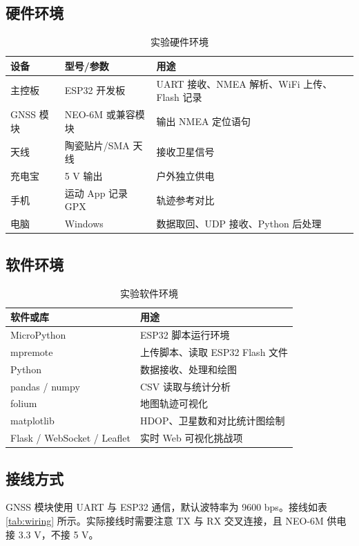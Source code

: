\documentclass[UTF8,a4paper,12pt]{ctexart}
\begin{document}
\subsection{硬件环境}
\begin{table}[H]
\centering
\caption{实验硬件环境}
\begin{tabular}{lll}
\toprule
设备 & 型号/参数 & 用途 \\
\midrule
主控板 & ESP32 开发板 & UART 接收、NMEA 解析、WiFi 上传、Flash 记录 \\
GNSS 模块 & NEO-6M 或兼容模块 & 输出 NMEA 定位语句 \\
天线 & 陶瓷贴片/SMA 天线 & 接收卫星信号 \\
充电宝 & 5 V 输出 & 户外独立供电 \\
手机 & 运动 App 记录 GPX & 轨迹参考对比 \\
电脑 & Windows & 数据取回、UDP 接收、Python 后处理 \\
\bottomrule
\end{tabular}
\end{table}

\subsection{软件环境}
\begin{table}[H]
\centering
\caption{实验软件环境}
\begin{tabular}{ll}
\toprule
软件或库 & 用途 \\
\midrule
MicroPython & ESP32 脚本运行环境 \\
mpremote & 上传脚本、读取 ESP32 Flash 文件 \\
Python & 数据接收、处理和绘图 \\
pandas / numpy & CSV 读取与统计分析 \\
folium & 地图轨迹可视化 \\
matplotlib & HDOP、卫星数和对比统计图绘制 \\
Flask / WebSocket / Leaflet & 实时 Web 可视化挑战项 \\
\bottomrule
\end{tabular}
\end{table}

\subsection{接线方式}
GNSS 模块使用 UART 与 ESP32 通信，默认波特率为 9600 bps。接线如表 \ref{tab:wiring} 所示。实际接线时需要注意 TX 与 RX 交叉连接，且 NEO-6M 供电接 3.3 V，不接 5 V。
\end{document}
